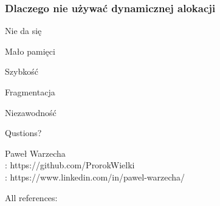 \documentclass{beamer}
\makeatletter
\newenvironment{myitemize}{%
   \setlength{\topsep}{0pt}
   \setlength{\partopsep}{0pt}
   \renewcommand*{\@listi}{\leftmargin\leftmargini \parsep\z@ \topsep\z@ \itemsep\z@}
   \let\@listI\@listi
   \itemize
}{\enditemize}
\makeatother
\begin{document}
\begin{frame}[t]
    \frametitle{Dlaczego nie używać dynamicznej alokacji}
    \begin{myitemize}
        \item Nie da się
        \item Mało pamięci
        \item Szybkość
        \item Fragmentacja
        \item Niezawodność
    \end{myitemize}
\end{frame}
\begin{frame}
\begin{center}
    \vspace{20mm}
    \Huge Qustions?
\end{center}

\vspace{35mm}
\hspace{55mm}\tiny Paweł Warzecha\\
\hspace{55mm}\tiny \faGithub :  https://github.com/ProrokWielki\\
\hspace{55mm}\tiny \faLinkedin :  https://www.linkedin.com/in/pawel-warzecha/\\
\end{frame}
\begin{frame}[t]
    All references:
    \AtNextBibliography{\tiny}
     \nocite{*}\printbibliography
\end{frame}
\end{document}
